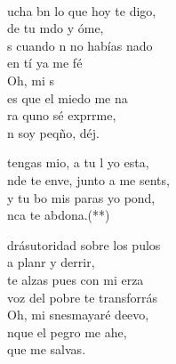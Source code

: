 \begin{cancion}%
	    \\
	ucha bn lo que hoy te digo,\\
	 de tu mdo y óme, \\
	s cuando n no habías nado \\
	 en tí ya me fé\\
	\jump
	Oh, mi s\\
	es que el miedo me na\\
	ra quno sé exprrme,\\
	n soy peqño, déj. \jump\\
	\begin{chorus}%
		 tengas mio, a tu l yo esta,\\
		nde te enve, junto a me sents,  \\
		y  tu bo mis paras yo pond,\\
		nca te abdona.(**)\jump\\
	\end{chorus}%
	drásutoridad sobre los pulos\\
	a planr y derrir,\\
	 te alzas pues con mi erza \\
	 voz del pobre te transforrás\\
	\jump
	Oh, mi snesmayaré deevo,\\
	nque el pegro me ahe,\\
	 que  me salvas.  \jump\\

\end{cancion}
